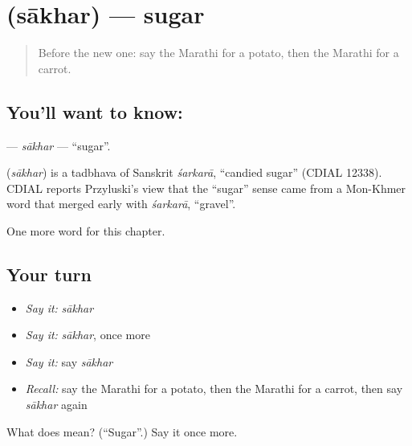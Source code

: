 \section[\texorpdfstring{\mr{साखर} (sākhar)}{साखर (sākhar)}]{ (sākhar) — sugar}

\label{lesson:MR-C86-sakhar}



\begin{quote}
Before the new one: say the Marathi for a potato, then the Marathi for a carrot.
\end{quote}

\subsection*{You'll want to know: }
\textbf{} — \emph{sākhar} — \textquotedblleft{}sugar\textquotedblright{}.

\begin{cousinweb}
\textbf{} (\emph{sākhar}) is a tadbhava of Sanskrit \emph{śarkarā}, \textquotedblleft{}candied sugar\textquotedblright{} (CDIAL 12338). CDIAL reports Przyluski's view that the \textquotedblleft{}sugar\textquotedblright{} sense came from a Mon-Khmer word that merged early with \emph{śarkarā}, \textquotedblleft{}gravel\textquotedblright{}.
\end{cousinweb}

\begin{grammarlens}[title={What you've built}]
One more word for this chapter.
\end{grammarlens}

\subsection*{Your turn}
\begin{itemize}
\raggedright
  \item \emph{Say it:} \emph{sākhar}
  \item \emph{Say it:} \emph{sākhar}, once more
  \item \emph{Say it:} say \emph{sākhar}
  \item \emph{Recall:} say the Marathi for a potato, then the Marathi for a carrot, then say \emph{sākhar} again
\end{itemize}

\begin{tcolorbox}[breakable,colback=teal!4,colframe=teal!35!black,title={Before you move on}]
What does  mean? (\textquotedblleft{}Sugar\textquotedblright{}.) Say it once more.
\end{tcolorbox}
